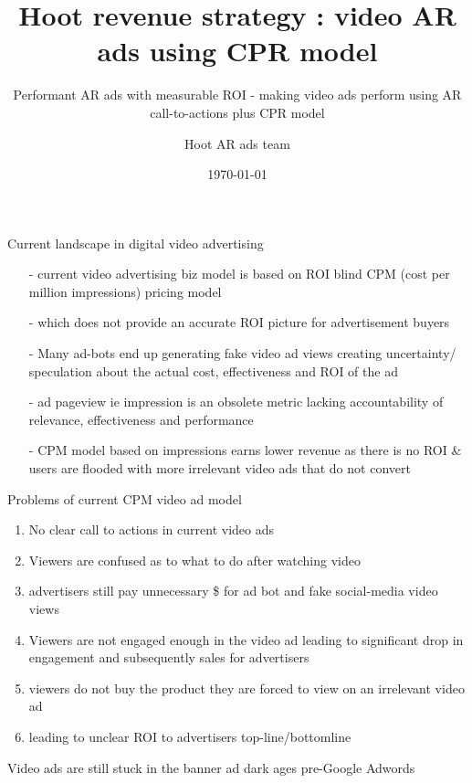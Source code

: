 \documentclass[10pt]{beamer}
\title{ Hoot revenue strategy : video AR ads using CPR model}
\subtitle{Performant AR ads with measurable ROI  - making video ads perform using AR call-to-actions plus CPR model}
\date{\today}
\author{Hoot AR ads team}
\institute{Hoot Live inc., a Delaware C-corp}
\begin{document}
\maketitle



\begin{frame}[fragile]{Current landscape in digital video advertising}
  \begin{itemize}[<+-| alert@+>]%
	  
\item[-]current video advertising biz model is based on ROI blind CPM (cost per million impressions) pricing model
\item[-]which does not provide an accurate ROI picture for advertisement buyers
\item[-]Many ad-bots end up generating fake video ad views creating uncertainty/ speculation about the actual cost, effectiveness and ROI of the ad
\item[-]ad pageview ie impression is an obsolete metric lacking accountability of relevance, effectiveness and performance 
\item[-]CPM model based on impressions earns lower revenue as there is no ROI \& users are flooded with more irrelevant video ads that do not convert
\end{itemize}

\end{frame}
\begin{frame}[t]{Problems of current CPM video ad model}
\begin{enumerate}[<+-| alert@+>]
\item No clear call to actions in current video ads
\item Viewers are confused as to what to do after watching video
\item advertisers still pay unnecessary \$ for ad bot  and fake social-media video views
\item Viewers are not engaged enough in the video ad leading to  significant drop in engagement and subsequently sales for advertisers
\item viewers do not buy the product they are forced to view on an irrelevant video ad
\item leading to unclear ROI to advertisers top-line/bottomline

\end{enumerate}
\pause
Video ads are still stuck in the banner ad dark ages pre-Google Adwords

\end{frame}
\end{document}

